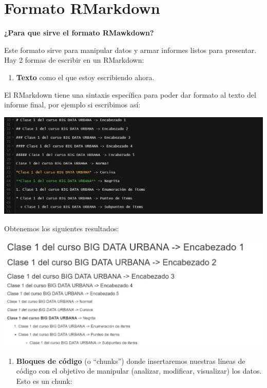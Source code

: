 \documentclass[
  spanish,
]{book}
\providecommand{\tightlist}{%
  \setlength{\itemsep}{0pt}\setlength{\parskip}{0pt}}
\begin{document}
\hypertarget{formato-rmarkdown}{%
\section{Formato RMarkdown}\label{formato-rmarkdown}}

\textbf{¿Para que sirve el formato RMawkdown?}

Este formato sirve para manipular datos y armar informes listos para presentar. Hay 2 formas de escribir en un RMarkdown:

\begin{enumerate}
\def\labelenumi{\arabic{enumi}.}
\tightlist
\item
  \textbf{Texto} como el que estoy escribiendo ahora.
\end{enumerate}

El RMarkdown tiene una sintaxis específica para poder dar formato al texto del informe final, por ejemplo si escribimos así:

\includegraphics{images/000.jpg}

Obtenemos los siguientes resultados:

\includegraphics{images/000_1.jpg}

\begin{enumerate}
\def\labelenumi{\arabic{enumi}.}
\setcounter{enumi}{1}
\tightlist
\item
  \textbf{Bloques de código} (o ``chunks'') donde insertaremos nuestras líneas de código con el objetivo de manipular (analizar, modificar, visualizar) los datos. Esto es un chunk:
\end{enumerate}
\end{document}
